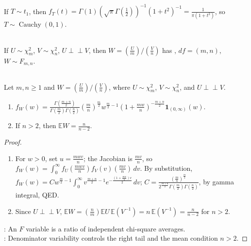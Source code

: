 \begin{example} \label{ex:t-one-is-cauchy} \\
If $T\sim t_1$, then $f_T(t)=\Gamma(1)(\sqrt{\pi}\Gamma(\frac{1}{2}))^{-1}(1+t^2)^{-1}=\frac{1}{\pi(1+t^2)}$, so $T\sim\operatorname{Cauchy}(0,1)$.
\end{example}

\begin{definition} \label{def:f-distribution} \\
If $U\sim\chi_m^2$, $V\sim\chi_n^2$, $U\perp\!\!\!\perp V$, then $W=(\frac{U}{m})/(\frac{V}{n})$ has , $df = (m, n)$, $W\sim F_{m,n}$.
\end{definition}

\begin{proposition} \label{prop:f-density} \\
Let $m,n\geq1$ and $W=(\frac{U}{m})/(\frac{V}{n})$, where $U\sim\chi_m^2$, $V\sim\chi_n^2$, and $U\perp\!\!\!\perp V$.
\begin{enumerate}[label=(\roman*)]
\setlength{\itemsep}{0pt}
\item $f_W(w)=\frac{\Gamma(\frac{m+n}{2})}{\Gamma(\frac{m}{2})\Gamma(\frac{n}{2})}(\frac{m}{n})^{\frac{m}{2}}w^{\frac{m}{2}-1}(1+\frac{mw}{n})^{-\frac{m+n}{2}}\mathbf{1}_{(0,\infty)}(w)$.
\item If $n>2$, then $\mathbb{E}W=\frac{n}{n-2}$.
\end{enumerate}
\begin{proof}
\begin{enumerate}[label=(\roman*)]
\setlength{\itemsep}{0pt}
\item For $w>0$, set $u=\frac{mwv}{n}$; the Jacobian is $\frac{mv}{n}$, so $f_W(w)=\int_0^\infty f_U(\frac{mwv}{n})f_V(v)(\frac{mv}{n})\,dv$. By substitution,\\
$f_W(w)=Cw^{\frac{m}{2}-1}\int_0^\infty v^{\frac{m+n}{2}-1}e^{-\frac{(1+\frac{mw}{n})v}{2}}\,dv$; $C=\frac{(\frac{m}{n})^{\frac{m}{2}}}{2^{\frac{m+n}{2}}\Gamma(\frac{m}{2})\Gamma(\frac{n}{2})}$, by gamma integral, QED.
\item Since $U\perp\!\!\!\perp V$, $\mathbb{E}W=(\frac{n}{m})\mathbb{E}U\,\mathbb{E}(V^{-1})=n\,\mathbb{E}(V^{-1})=\frac{n}{n-2}$ for $n>2$.
\end{enumerate}
: An $F$ variable is a ratio of independent chi-square averages.\\
: Denominator variability controls the right tail and the mean condition $n>2$.
\end{proof}
\end{proposition}

